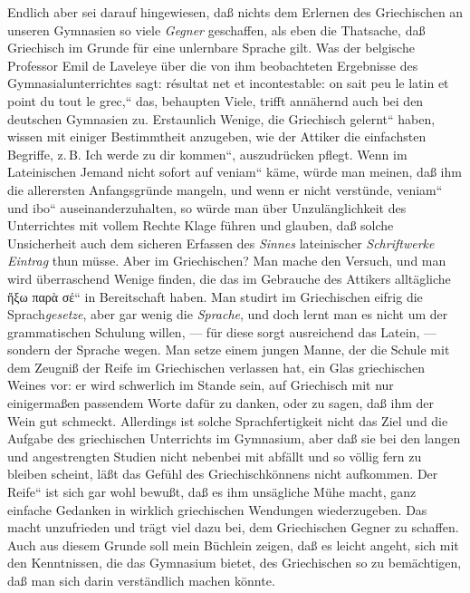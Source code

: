 Endlich aber sei darauf hingewiesen, daß nichts dem Erlernen des
Griechischen an unseren Gymnasien so viele \emph{Gegner} geschaffen,
als eben die Thatsache, daß Griechisch im Grunde für eine unlernbare
Sprache gilt. Was der belgische Professor Emil de Laveleye über die
von ihm beobachteten Ergebnisse des Gymnasial\textcompwordmark{}unter\textcompwordmark{}richtes
sagt: \quotedblbase \textfrench{résultat net et incontestable: on
sait peu le latin et point du tout le grec,}`` das, behaupten Viele,
trifft annähernd auch bei den deutschen Gymnasien zu. Erstaunlich
Wenige, die \quotedblbase Griechisch gelernt`` haben, wissen mit
einiger Bestimmt\textcompwordmark{}heit anzugeben, wie der Attiker
die einfachsten Begriffe, z.\,B. \quotedblbase Ich werde zu dir
kommen``, aus\textcompwordmark{}zudrücken pflegt. Wenn im Lateinischen
Jemand nicht sofort auf \quotedblbase \textlatin{veniam}`` käme,
würde man meinen, daß ihm die allerersten Anfangs\textcompwordmark{}gründe
mangeln, und wenn er nicht verstünde, \quotedblbase \textlatin{veniam}``
und \quotedblbase \textlatin{ibo}`` aus\textcompwordmark{}ein\textcompwordmark{}an\textcompwordmark{}der\textcompwordmark{}zu\textcompwordmark{}halten,
so würde man über Unzulänglichkeit des Unterrichtes mit vollem Rechte
Klage führen und glauben, daß solche Unsicherheit auch dem sicheren
Erfassen des \emph{Sinnes} lateinischer \emph{Schriftwerke Eintrag
}thun müsse. Aber  im Griechischen? Man mache den Versuch, und man
wird überraschend Wenige finden, die das im Gebrauche des Attikers
alltägliche \quotedblbase \textgreek[variant=ancient]{ἥξω παρὰ σέ}``
in Be\textcompwordmark{}reit\textcompwordmark{}schaft haben. Man
studirt im Griechischen eifrig die Sprach\emph{gesetze}, aber gar
wenig die \emph{Sprache}, und doch lernt man es nicht um der grammatischen
Schulung willen, --- für diese sorgt aus\textcompwordmark{}reichend
das Latein, --- sondern der Sprache wegen. Man setze einem jungen
Manne, der die Schule  mit dem Zeugniß der Reife im Griechischen
verlassen hat, ein Glas griechischen Weines vor: er wird schwerlich
im Stande sein, auf Griechisch mit nur einigermaßen passendem Worte
dafür zu danken, oder zu sagen, daß ihm der Wein gut schmeckt. Allerdings
ist solche Sprachfertigkeit nicht das Ziel und die Aufgabe des griechischen
Unterrichts im Gymnasium, aber daß sie bei den langen und angestrengten
Studien nicht nebenbei mit abfällt und so völlig fern zu bleiben
scheint, läßt das Gefühl des Griechischkönnens nicht aufkommen. Der
\quotedblbase Reife`` ist sich gar wohl bewußt, daß es ihm unsägliche
Mühe macht, ganz einfache Gedanken in wirklich griechischen Wendungen
wiederzugeben. Das macht unzufrieden und trägt viel dazu bei, dem
Griechischen Gegner zu schaffen. Auch aus diesem Grunde soll mein
Büchlein zeigen, daß es leicht angeht, sich mit den Kenntnissen,
die das Gymnasium bietet, des Griechischen so zu bemächtigen, daß
man sich darin verständlich machen könnte. 

